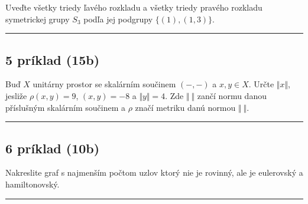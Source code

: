 \documentclass[11pt,a4paper]{article}
\begin{document}
  Uveďte všetky triedy ľavého rozkladu a všetky triedy pravého rozkladu symetrickej grupy $S_3$ podľa jej podgrupy $\{(1),(1,3)\}$.\\

  \hrule

\subsection*{5 príklad (15b)}

  Buď $X$ unitárny prostor se skalárním součinem $(-,-)$ a $x,y \in X$. Určte $\Vert x \Vert$, jesliže $\rho(x,y)=9$, $(x,y)=-8$ a $\Vert y \Vert = 4$. Zde $\Vert \ \Vert$ zančí normu danou příslušným skalárním součinem a $\rho$ značí metriku danú normou $\Vert \ \Vert$.\\

  \hrule

\subsection*{6 príklad (10b)}

  Nakreslite graf s najmenším počtom uzlov ktorý nie je rovinný, ale je eulerovský a hamiltonovský.\\

  \hrule
\end{document}
